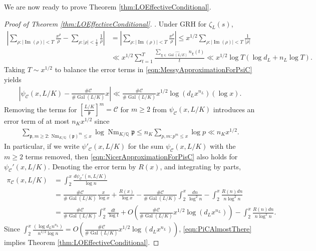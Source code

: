 \documentclass[12pt]{amsart}
\theoremstyle{definition}
\theoremstyle{remark}
\numberwithin{equation}{section}
\newcommand{\cC}{\mathcal C}
\newcommand{\fkp}{\mathfrak p}
\newcommand{\bbQ}{\mathbb Q}
\DeclareMathOperator{\norm}{Nm}
\DeclareMathOperator{\im}{Im}
\newcommand{\artin}[2]{\left[ \frac{#1}{#2}\right]}
\DeclareMathOperator{\Gal}{Gal}
\begin{document}
We are now ready to prove Theorem \ref{thm:LOEffectiveConditional}.
\begin{proof}[Proof of Theorem \ref{thm:LOEffectiveConditional}].
Under GRH for $\zeta_{L}(s)$,
\begin{align}
\left| \sum_{\rho: |\im(\rho)| < T} \frac{x^{\rho}}{\rho} - \sum_{\rho: |\rho| < \frac{1}{2}} \frac{1}{\rho}\right| & = \left| \sum_{\rho: |\im(\rho)| < T} \frac{x^{\rho}}{\rho}\right| \leq x^{1/2} \sum_{\rho: |\im(\rho)| < T} \frac{1}{|\rho|} \nonumber \\
 & \ll x^{1/2} \sum_{t=1}^{T} \frac{\sum_{\chi \in \widehat{\Gal(L/E)}} n_{\chi}(t)}{t}  \ll x^{1/2} \log T \left(\log d_{L} + n_{L} \log T\right).
\end{align}
Taking $T \sim x^{1/2}$ to balance the error terms in \eqref{eqn:MessyApproximationForPsiC} yields 
\begin{align}\label{eqn:NicerApproximationForPisC}
 \left|\psi_{\cC}(x, L/K) - \frac{\# \cC}{\# \Gal(L/K)} x\right| \ll \frac{\# \cC}{\# \Gal(L/K)}x^{1/2} \log(d_{L}x^{n_{L}}) (\log x).
\end{align}
Removing the terms for $\artin{L/K}{\fkp}^{m} = \cC$ for $m \geq 2$ from $\psi_{\cC}(x, L/K)$ introduces an error term of at most $n_{K} x^{1/2}$ since
\begin{align}
\sum_{\fkp, m\geq 2: \norm_{K/\bbQ}(\fkp)^{m} \leq x} \log \norm_{K/\bbQ} \fkp \leq n_{K} \sum_{p, m: p^{m} \leq x} \log p \ll n_{K} x^{1/2}.
\end{align}
 In particular, if we write $\psi'_{\cC}(x,L/K)$ for the sum $\psi_{\cC}(x,L/K)$ with the $m \geq 2$ terms removed, then \eqref{eqn:NicerApproximationForPisC} also holds for $\psi_{\cC}'(x,L/K)$. Denoting the error term by $R(x)$, and integrating by parts,
\begin{align}
\pi_{\cC}(x, L/K) & = \int_{2}^{x} \frac{d\psi_{\cC}'(n, L/K)}{\log n} \nonumber \\
                  & = \frac{\# \cC}{\# \Gal(L/K)} \frac{x}{\log x} + \frac{R(x)}{\log x}  - \frac{\# \cC}{\# \Gal(L/K)} \int_{2}^{x} \frac{dn}{\log^2 n} - \int_{2}^{x} \frac{R(n)dn }{n\log^2 n} \nonumber \\
                  & = \frac{\# \cC}{\# \Gal(L/K)} \int_{2}^{x} \frac{dt}{\log t} + O\left(\frac{\# \cC}{\# \Gal(L/K)} x^{1/2} \log(d_{L}x^{n_{L}})\right) - \int_{2}^{x} \frac{R(n)dn }{n\log^2 n}. \label{eqn:PiCAlmostThere}
\end{align}
Since $\int_{2}^{x} \frac{(\log d_{L}n^{n_{L}})}{n^{1/2}\log n} = O\left(\frac{\# \cC}{\# \Gal(L/K)} x^{1/2} \log(d_{L}x^{n_{L}})\right)$, \eqref{eqn:PiCAlmostThere} implies Theorem \ref{thm:LOEffectiveConditional}. 
\end{proof}
\end{document}
